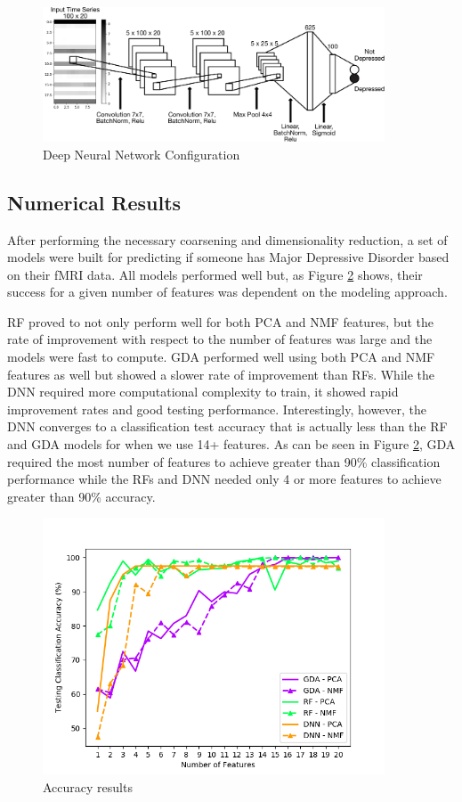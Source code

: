 \documentclass{article}[12pt]
\begin{document}
   \begin{figure}[!htb]
   	\centering
   	\includegraphics[width=4in]{DNN_diagram_annotated.pdf}
   	\caption{Deep Neural Network Configuration}
   	\label{fig:dnnConfig}
   \end{figure}
   
   
   \subsection{Numerical Results}
   After performing the necessary coarsening and dimensionality reduction, a set of models were built for predicting if someone has Major Depressive Disorder based on their fMRI data.  All models performed well but, as Figure \ref{fig:accuracyResults} shows, their success for a given number of features was dependent on the modeling approach. 
   
   RF proved to not only perform well for both PCA and NMF features, but the rate of improvement with respect to the number of features was large and the models were fast to compute. GDA performed well using both PCA and NMF features as well but showed a slower rate of improvement than RFs. While the DNN required more computational complexity to train, it showed rapid improvement rates and good testing performance. Interestingly, however, the DNN converges to a classification test accuracy that is actually less than the RF and GDA models for when we use 14+ features. As can be seen in Figure \ref{fig:accuracyResults}, GDA required the most number of features to achieve greater than 90\% classification performance while the RFs and DNN needed only 4 or more features to achieve greater than 90\% accuracy.
   
    \begin{figure}[!htb]
   	\centering
   	\includegraphics[width=4in]{../plots/fdim_vs_accuracy_all.png}
   	\caption{Accuracy results}
   	\label{fig:accuracyResults}
   \end{figure}
   
\end{document}
